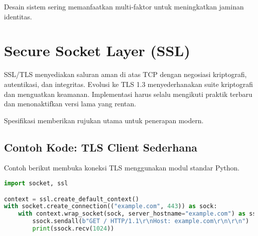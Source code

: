 \documentclass[../main.tex]{subfiles}
\begin{document}
Desain sistem sering memanfaatkan multi-faktor untuk meningkatkan jaminan identitas.

\section{Secure Socket Layer (SSL)}
SSL/TLS menyediakan saluran aman di atas TCP dengan negosiasi kriptografi, autentikasi, dan integritas. Evolusi ke TLS 1.3 menyederhanakan suite kriptografi dan menguatkan keamanan. Implementasi harus selalu mengikuti praktik terbaru dan menonaktifkan versi lama yang rentan.

Spesifikasi \textcite{rfc8446} memberikan rujukan utama untuk penerapan modern.

\subsection{Contoh Kode: TLS Client Sederhana}
Contoh berikut membuka koneksi TLS menggunakan modul standar Python.

\begin{lstlisting}[language=Python, caption={TLS client}, label={lst:tls-client}]
import socket, ssl

context = ssl.create_default_context()
with socket.create_connection(("example.com", 443)) as sock:
    with context.wrap_socket(sock, server_hostname="example.com") as ssock:
        ssock.sendall(b"GET / HTTP/1.1\r\nHost: example.com\r\n\r\n")
        print(ssock.recv(1024))
\end{lstlisting}
\end{document}
